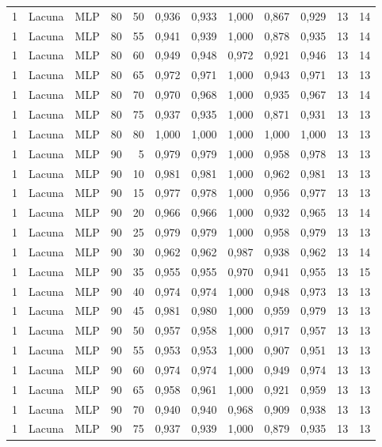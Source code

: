 \begin{longtable}{@{}rllrrrrrrrrr@{}}
1 & Lacuna & MLP & 80 & 50 & 0,936 & 0,933 & 1,000 & 0,867 & 0,929 & 13 & 14 \\
1 & Lacuna & MLP & 80 & 55 & 0,941 & 0,939 & 1,000 & 0,878 & 0,935 & 13 & 14 \\
1 & Lacuna & MLP & 80 & 60 & 0,949 & 0,948 & 0,972 & 0,921 & 0,946 & 13 & 14 \\
1 & Lacuna & MLP & 80 & 65 & 0,972 & 0,971 & 1,000 & 0,943 & 0,971 & 13 & 13 \\
1 & Lacuna & MLP & 80 & 70 & 0,970 & 0,968 & 1,000 & 0,935 & 0,967 & 13 & 14 \\
1 & Lacuna & MLP & 80 & 75 & 0,937 & 0,935 & 1,000 & 0,871 & 0,931 & 13 & 13 \\
1 & Lacuna & MLP & 80 & 80 & 1,000 & 1,000 & 1,000 & 1,000 & 1,000 & 13 & 13 \\
1 & Lacuna & MLP & 90 & 5 & 0,979 & 0,979 & 1,000 & 0,958 & 0,978 & 13 & 13 \\
1 & Lacuna & MLP & 90 & 10 & 0,981 & 0,981 & 1,000 & 0,962 & 0,981 & 13 & 13 \\
1 & Lacuna & MLP & 90 & 15 & 0,977 & 0,978 & 1,000 & 0,956 & 0,977 & 13 & 13 \\
1 & Lacuna & MLP & 90 & 20 & 0,966 & 0,966 & 1,000 & 0,932 & 0,965 & 13 & 14 \\
1 & Lacuna & MLP & 90 & 25 & 0,979 & 0,979 & 1,000 & 0,958 & 0,979 & 13 & 13 \\
1 & Lacuna & MLP & 90 & 30 & 0,962 & 0,962 & 0,987 & 0,938 & 0,962 & 13 & 14 \\
1 & Lacuna & MLP & 90 & 35 & 0,955 & 0,955 & 0,970 & 0,941 & 0,955 & 13 & 15 \\
1 & Lacuna & MLP & 90 & 40 & 0,974 & 0,974 & 1,000 & 0,948 & 0,973 & 13 & 13 \\
1 & Lacuna & MLP & 90 & 45 & 0,981 & 0,980 & 1,000 & 0,959 & 0,979 & 13 & 13 \\
1 & Lacuna & MLP & 90 & 50 & 0,957 & 0,958 & 1,000 & 0,917 & 0,957 & 13 & 13 \\
1 & Lacuna & MLP & 90 & 55 & 0,953 & 0,953 & 1,000 & 0,907 & 0,951 & 13 & 13 \\
1 & Lacuna & MLP & 90 & 60 & 0,974 & 0,974 & 1,000 & 0,949 & 0,974 & 13 & 13 \\
1 & Lacuna & MLP & 90 & 65 & 0,958 & 0,961 & 1,000 & 0,921 & 0,959 & 13 & 13 \\
1 & Lacuna & MLP & 90 & 70 & 0,940 & 0,940 & 0,968 & 0,909 & 0,938 & 13 & 13 \\
1 & Lacuna & MLP & 90 & 75 & 0,937 & 0,939 & 1,000 & 0,879 & 0,935 & 13 & 13 \\

\end{longtable}
